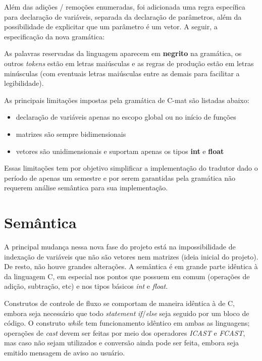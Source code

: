 \documentclass[
	article,			%
	11pt,				%
	oneside,			%
	a4paper,			%
	english,			%
	brazil,				%
	sumario=tradicional
	]{abntex2}
\renewcommand{\it}[1]{\textit{#1}}
\renewcommand{\bf}[1]{\textbf{#1}}
\begin{document}
Além das adições / remoções enumeradas, foi adicionada uma regra específica para declaração de variáveis, separada da declaração de parâmetros, além da possibilidade de explicitar que um parâmetro é um vetor.
A seguir, a especificação da nova gramática:
	

As palavras reservadas da linguagem aparecem em \bf{negrito} na gramática, os outros \it{tokens} estão em letras maiúsculas e as regras de produção estão em letras minúsculas (com eventuais letras maiúsculas entre as demais para facilitar a legibilidade).

As principais limitações impostas pela gramática de C-mat são listadas abaixo:
\begin{itemize}
	\item declaração de variáveis apenas no escopo global ou no início de funções
	\item matrizes são sempre bidimensionais
	\item vetores são unidimensionais e suportam apenas os tipos \bf{int} e \bf{float}
\end{itemize}
Essas limitações tem por objetivo simplificar a implementação do tradutor dado o período de apenas um semestre e por serem garantidas pela gramática não requerem análise semântica para sua implementação.






\section{Semântica}
A principal mudança nessa nova fase do projeto está na impossibilidade de indexação de variáveis que não são vetores nem matrizes (ideia inicial do projeto). De resto, não houve grandes alterações. A semântica é em grande parte idêntica à da linguagem C, em especial nos pontos que possuem em comum (operações de adição, subtração, etc) e nos tipos básicos \it{int} e \it{float}. 

Construtos de controle de fluxo se comportam de maneira idêntica à de C, embora seja necessário que todo \it{statement} \it{if}/\it{else} seja seguido por um bloco de código. O construto \it{while} tem funcionamento idêntico em ambas as linguagens; operações de \it{cast} devem ser feitas por meio dos operadores \it{ICAST} e \it{FCAST}, mas caso não sejam utilizados e conversão ainda pode ser feita, embora seja emitido mensagem de aviso ao usuário.
\end{document}
